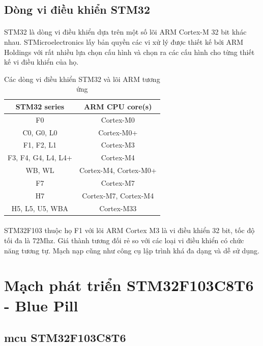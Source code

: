\subsection{Dòng vi điều khiển STM32}
\paragraph{}
STM32 là dòng vi điều khiển dựa trên một số lõi ARM Cortex-M 32 bit khác nhau\cite{stm32-types}. STMicroelectronics lấy bản quyền các vi xử lý được thiết kế bởi ARM Holdings với rất nhiều lựa chọn cấu hình và chọn ra các cấu hình cho từng thiết kế vi điều khiển của họ.


\begin{table}
    \centering
    \caption{Các dòng vi điều khiển STM32 và lõi ARM tương ứng}
    \begin{tabular}{|c|c|}
    \hline
    STM32 series & ARM CPU core(s) \\
    \hline
    F0 & Cortex-M0 \\
    \hline
    C0, G0, L0 & Cortex-M0+\\
    \hline
    F1, F2, L1 & Cortex-M3\\
    \hline
    F3, F4, G4, L4, L4+ & Cortex-M4\\
    \hline
    WB, WL & Cortex-M4, Cortex-M0+\\
    \hline
    F7 & Cortex-M7\\
    \hline
    H7 & Cortex-M7, Cortex-M4 \\
    \hline
    H5, L5, U5, WBA & Cortex-M33 \\
    \hline
    \end{tabular}
\end{table}
\paragraph{}
STM32F103 thuộc họ F1 với lõi ARM Cortex M3 là vi điều khiển 32 bit, tốc độ tối đa là 72Mhz. Giá thành tương đối rẻ so với các loại vi điều khiển có chức năng tương tự. Mạch nạp cũng như công cụ lập trình khá đa dạng và dễ sử dụng.
\section{Mạch phát triển STM32F103C8T6 - Blue Pill}
\subsection{\Acrlong{mcu} STM32F103C8T6}
